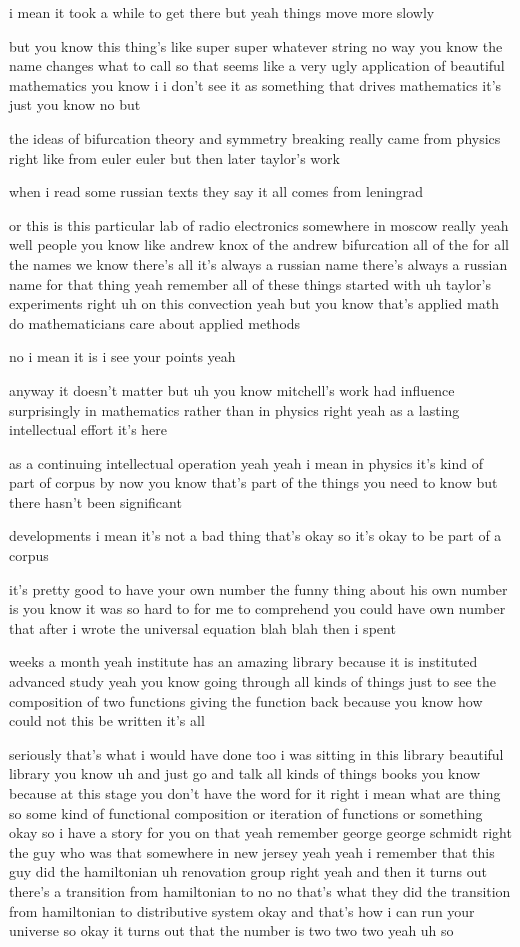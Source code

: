 \begin{description}
i mean it took a while to get there but yeah things move more slowly

but you know this thing's like super super whatever string no way you know the name changes what to call so that seems like a very ugly application of beautiful mathematics you know i i don't see it as something that drives mathematics it's just you know no but

the ideas of bifurcation theory and symmetry breaking really came from physics right like from euler euler but then later taylor's work

when i read some russian texts they say it all comes from leningrad

or this is this particular lab of radio electronics somewhere in moscow really yeah well people you know like andrew knox of the andrew bifurcation all of the for all the names we know there's all it's always a russian name there's always a russian name for that thing yeah remember all of these things started with uh taylor's experiments right uh on this convection yeah but you know that's applied math do mathematicians care about applied methods

no i mean it is i see your points yeah

anyway it doesn't matter but uh you know mitchell's work had influence surprisingly in mathematics rather than in physics right yeah as a lasting intellectual effort it's here

as a continuing intellectual operation yeah yeah i mean in physics it's kind of part of corpus by now you know that's part of the things you need to know but there hasn't been significant

developments i mean it's not a bad thing that's okay so it's okay to be part of a corpus

it's pretty good to have your own number the funny thing about his own number is you know it was so hard to for me to comprehend you could have own number that after i wrote the universal equation blah blah then i spent

weeks a month yeah institute has an amazing library because it is instituted advanced study yeah you know going through all kinds of things just to see the composition of two functions giving the function back because you know how could not this be written it's all

seriously that's what i would have done too i was sitting in this library beautiful library you know uh and just go and talk all kinds of things books you know because at this stage you don't have the word for it right i mean what are thing so some kind of functional composition or iteration of functions or something okay so i have a story for you on that yeah remember george george schmidt right the guy who was that somewhere in new jersey yeah yeah i remember that this guy did the hamiltonian uh renovation group right yeah and then it turns out there's a transition from hamiltonian to no no that's what they did the transition from hamiltonian to distributive system okay and that's how i can run your universe so okay it turns out that the number is two two two yeah uh so


\end{description}
